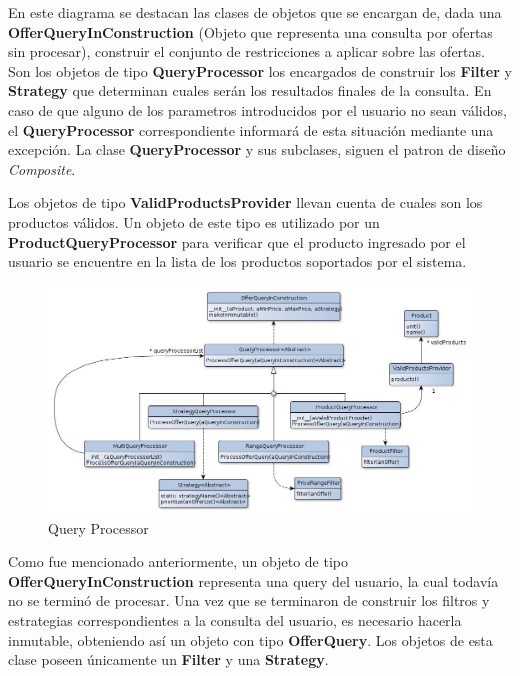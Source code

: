 \documentclass[10pt, a4paper]{article}
\begin{document}
\begin{landscape}

\newpage
En este diagrama se destacan las clases de objetos que se encargan de, dada una \textbf{OfferQueryInConstruction} (Objeto que representa una consulta por ofertas sin procesar), construir el conjunto de restricciones a aplicar sobre las ofertas. Son los objetos de tipo \textbf{QueryProcessor} los encargados de construir los \textbf{Filter} y \textbf{Strategy} que determinan cuales serán los resultados finales de la consulta. En caso de que alguno de los parametros introducidos por el usuario no sean válidos, el \textbf{QueryProcessor} correspondiente informará de esta situación mediante una excepción. La clase \textbf{QueryProcessor} y sus subclases, siguen el patron de diseño \emph{Composite}.

Los objetos de tipo \textbf{ValidProductsProvider} llevan cuenta de cuales son los productos válidos. Un objeto de este tipo es utilizado por un \textbf{ProductQueryProcessor} para verificar que el producto ingresado por el usuario se encuentre en la lista de los productos soportados por el sistema.

\begin{figure}[H]
\centering
\includegraphics[scale=0.65]{graphics/queryProcessor_class.jpg}
\caption{Query Processor}
\end{figure}

\newpage
Como fue mencionado anteriormente, un objeto de tipo \textbf{OfferQueryInConstruction} representa una query del usuario, la cual todavía no se terminó de procesar. Una vez que se terminaron de construir los filtros y estrategias correspondientes a la consulta del usuario, es necesario hacerla inmutable, obteniendo así un objeto con tipo \textbf{OfferQuery}. Los objetos de esta clase poseen únicamente un \textbf{Filter} y una \textbf{Strategy}.


\end{landscape}
\end{document}
